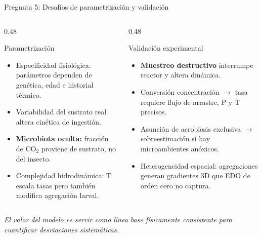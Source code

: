 \documentclass[aspectratio=169, 11pt]{beamer}
\begin{document}
\begin{frame}{Pregunta 5: Desafíos de parametrización y validación}
\begin{columns}[T]
\begin{column}{0.48\textwidth}
\begin{alertblock}{Parametrización}
\footnotesize
\begin{itemize}
    \item Especificidad fisiológica: parámetros dependen de genética, edad e historial térmico.
    \item Variabilidad del sustrato real altera cinética de ingestión.
    \item \textbf{Microbiota oculta:} fracción de CO$_2$ proviene de sustrato, no del insecto.
    \item Complejidad hidrodinámica: T escala tasas pero también modifica agregación larval.
\end{itemize}
\end{alertblock}
\end{column}
\begin{column}{0.48\textwidth}
\begin{alertblock}{Validación experimental}
\footnotesize
\begin{itemize}
    \item \textbf{Muestreo destructivo} interrumpe reactor y altera dinámica.
    \item Conversión concentración $\rightarrow$ tasa requiere flujo de arrastre, P y T precisos.
    \item Asunción de aerobiosis exclusiva $\rightarrow$ sobreestimación si hay microambientes anóxicos.
    \item Heterogeneidad espacial: agregaciones generan gradientes 3D que EDO de orden cero no captura.
\end{itemize}
\end{alertblock}
\end{column}
\end{columns}
\vspace{0.2cm}
\centering
\footnotesize\textit{El valor del modelo es servir como línea base físicamente consistente para cuantificar desviaciones sistemáticas.}
\end{frame}
\end{document}
